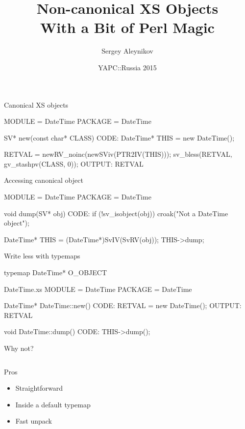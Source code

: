\documentclass[mathserif,hyperref={urlcolor=cyan,colorlinks=true}]{beamer}
\title{Non-canonical XS Objects\\With a Bit of Perl Magic}
\author{Sergey Aleynikov}
\institute{Crazy Panda}
\date[May 2015]{YAPC::Russia 2015}
\begin{document}
\begin{frame}
\titlepage
\end{frame}

\begin{frame}[fragile]{Canonical XS objects}
\begin{ccode}
MODULE = DateTime   PACKAGE = DateTime

SV*
new(const char* CLASS)
CODE:
    DateTime* THIS = new DateTime();

    RETVAL = newRV_noinc(newSViv(PTR2IV(THIS)));
    sv_bless(RETVAL, gv_stashpv(CLASS, 0));
OUTPUT:
    RETVAL
\end{ccode}
\end{frame}

\begin{frame}[fragile]{Accessing canonical object}
\begin{ccode}
MODULE = DateTime   PACKAGE = DateTime

void
dump(SV* obj)
CODE:
    if (!sv_isobject(obj))
        croak("Not a DateTime object");

    DateTime* THIS = (DateTime*)SvIV(SvRV(obj));
    THIS->dump;
\end{ccode}
\end{frame}

\begin{frame}[fragile]{Write less with typemaps}
\begin{ccode}
typemap
DateTime* O_OBJECT

DateTime.xs
MODULE = DateTime   PACKAGE = DateTime

DateTime*
DateTime::new()
CODE:
    RETVAL = new DateTime();
OUTPUT:
    RETVAL

void
DateTime::dump()
CODE:
    THIS->dump();
\end{ccode}
\end{frame}

\begin{frame}{Why not?}
    \begin{columns}[c]
        \begin{exampleblock}{Pros}
        \begin{itemize}
            \item Straightforward
            \item Inside a default typemap
            \item Fast unpack
        \end{itemize}
        \end{exampleblock}
    \end{columns}
\end{frame}
\end{document}
